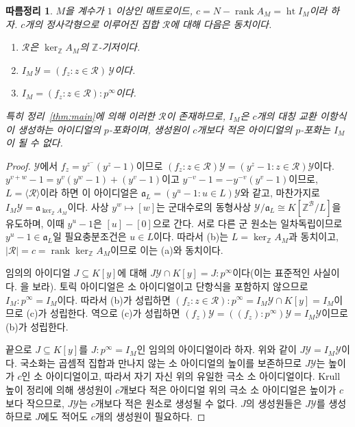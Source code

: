 \documentclass[11pt,a4paper]{article}
\theoremstyle{plain}
\newtheorem{corollary}[theorem]{따름정리}
\theoremstyle{definition}
\newcommand{\Z}{\mathbb Z}
\newcommand{\AM}{A_M}
\newcommand{\kerZ}{\ker_{\Z}\!A_M}
\newcommand{\bs}{\mathcal B}
\newcommand{\rank}{\operatorname{rank}}
\begin{document}
\begin{corollary}\label{cor:toric}
$M$을 계수가 $1$ 이상인 매트로이드, $c=N-\rank\AM=\operatorname{ht}I_M$이라 하자. $c$개의 정사각형으로 이루어진 집합 $\mathcal R$에 대해 다음은 동치이다.
\begin{enumerate}[label=(\alph*),itemsep=1pt]
\item $\mathcal R$은 $\kerZ$의 $\Z$\nobreakdash-기저이다.
\item $I_M\,\mathcal Y=(f_z:z\in\mathcal R)\,\mathcal Y$이다.
\item $I_M=(f_z:z\in\mathcal R):p^{\infty}$이다.
\end{enumerate}
특히 정리~\ref{thm:main}에 의해 이러한 $\mathcal R$이 존재하므로, $I_M$은 $c$개의 대칭 교환 이항식이 생성하는 아이디얼의 $p$\nobreakdash-포화이며, 생성원이 $c$개보다 적은 아이디얼의 $p$\nobreakdash-포화는 $I_M$이 될 수 없다.
\end{corollary}
\begin{proof}
$\mathcal Y$에서 $f_z=y^{z^-}(y^z-1)$이므로 $(f_z:z\in\mathcal R)\mathcal Y=(y^z-1:z\in\mathcal R)\mathcal Y$이다. $y^{v+w}-1=y^v(y^w-1)+(y^v-1)$이고 $y^{-v}-1=-y^{-v}(y^v-1)$이므로, $L=\langle\mathcal R\rangle$이라 하면 이 아이디얼은 $\mathfrak a_L=(y^u-1:u\in L)\mathcal Y$와 같고, 마찬가지로 $I_M\mathcal Y=\mathfrak a_{\kerZ}$이다. 사상 $y^w\mapsto[w]$는 군대수로의 동형사상 $\mathcal Y/\mathfrak a_L\cong K[\Z^{\bs}/L]$을 유도하며, 이때 $y^u-1$은 $[u]-[0]$으로 간다. 서로 다른 군 원소는 일차독립이므로 $y^u-1\in\mathfrak a_L$일 필요충분조건은 $u\in L$이다. 따라서 (b)는 $L=\kerZ$과 동치이고, $|\mathcal R|=c=\rank\kerZ$이므로 이는 (a)와 동치이다.

임의의 아이디얼 $J\subseteq K[y]$에 대해 $J\mathcal Y\cap K[y]=J:p^{\infty}$이다(이는 표준적인 사실이다. \cite{ES96}을 보라). 토릭 아이디얼은 소 아이디얼이고 단항식을 포함하지 않으므로 $I_M:p^\infty=I_M$이다. 따라서 (b)가 성립하면 $(f_z:z\in\mathcal R):p^\infty=I_M\mathcal Y\cap K[y]=I_M$이므로 (c)가 성립한다. 역으로 (c)가 성립하면 $(f_z)\mathcal Y=((f_z):p^\infty)\mathcal Y=I_M\mathcal Y$이므로 (b)가 성립한다.

끝으로 $J\subseteq K[y]$를 $J:p^\infty=I_M$인 임의의 아이디얼이라 하자. 위와 같이 $J\mathcal Y=I_M\mathcal Y$이다. 국소화는 곱셈적 집합과 만나지 않는 소 아이디얼의 높이를 보존하므로 $J\mathcal Y$는 높이가 $c$인 소 아이디얼이고, 따라서 자기 자신 위의 유일한 극소 소 아이디얼이다. Krull 높이 정리에 의해 생성원이 $c$개보다 적은 아이디얼 위의 극소 소 아이디얼은 높이가 $c$보다 작으므로, $J\mathcal Y$는 $c$개보다 적은 원소로 생성될 수 없다. $J$의 생성원들은 $J\mathcal Y$를 생성하므로 $J$에도 적어도 $c$개의 생성원이 필요하다.
\end{proof}
\end{document}

